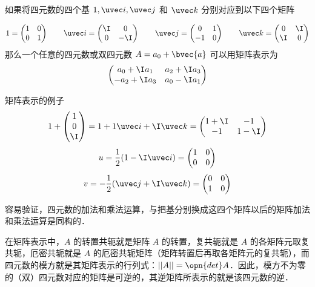 如果将四元数的四个基 $1, \uvec i, \uvec j$ 和 $\uvec k$ 分别对应到以下四个矩阵

\begin{equation}
1=\begin{pmatrix}1&0\\0&1\end{pmatrix} 
\qquad
\uvec i=\begin{pmatrix}\I&0\\0&-\I\end{pmatrix} 
\qquad
\uvec j=\begin{pmatrix}0&1\\-1&0\end{pmatrix} 
\qquad
\uvec k=\begin{pmatrix}0&\I\\\I&0\end{pmatrix} 
\end{equation}
那么一个任意的四元数或双四元数 $A=a_0+\bvec{a}$ 可以用矩阵表示为
\begin{equation}
\begin{pmatrix}a_0+\I a_1&a_2+\I a_3\\-a_2+\I a_3&a_0-\I a_1 \end{pmatrix} 
\end{equation}

\begin{example}{矩阵表示的例子}\label{Quat_ex1}
\begin{equation}
1+\begin{pmatrix}1\\0\\\I\end{pmatrix} =1+1\uvec i+\I\uvec k =\begin{pmatrix}1+\I&-1\\-1&1-\I\end{pmatrix} 
\end{equation}
\begin{equation}
u=\frac{1}{2}(1-\I\uvec i)=\begin{pmatrix}1&0\\0&0\end{pmatrix} 
\end{equation}
\begin{equation}
v=-\frac{1}{2}(\uvec j+\I\uvec k)=\begin{pmatrix}0&0\\1&0\end{pmatrix} 
\end{equation}
\end{example}

容易验证，四元数的加法和乘法运算，与把基分别换成这四个矩阵以后的矩阵加法和乘法运算是同构的．

在矩阵表示中，$A$ 的转置共轭就是矩阵 $A$ 的转置，复共轭就是 $A$ 的各矩阵元取复共轭，厄密共轭就是 $A$ 的厄密共轭矩阵（矩阵转置后再取各矩阵元的复共轭），而四元数的模方就是其矩阵表示的行列式：$||A||=\opn{det}A$．因此，模方不为零的（双）四元数对应的矩阵是可逆的，其逆矩阵所表示的就是该四元数的逆．
